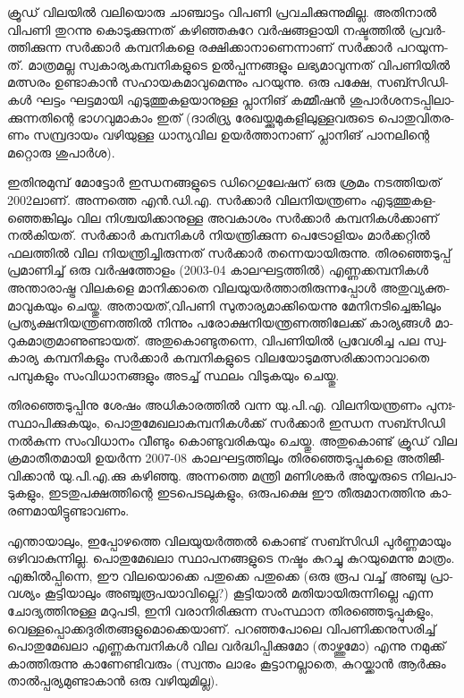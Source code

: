 ­ക്രൂ­ഡ് വി­ല­യില്‍ വലി­യൊ­രു ചാ­ഞ്ചാ­ട്ടം വി­പ­ണി പ്ര­വ­ചി­ക്കു­ന്നു­മി­ല്ല. അതി­നാല്‍ വി­പ­ണി തു­റ­ന്നു കൊ­ടു­ക്കു­ന്ന­ത് 
കഴി­ഞ്ഞ­കു­റേ വര്‍­ഷ­ങ്ങ­ളാ­യി നഷ്ട­ത്തില്‍ പ്ര­വര്‍­ത്തി­ക്കു­ന്ന സര്‍­ക്കാര്‍ കമ്പ­നി­ക­ളെ രക്ഷി­ക്കാ­നാ­ണെ­ന്നാ­ണ് സര്‍­ക്കാര്‍ 
പറ­യു­ന്ന­ത്. മാ­ത്ര­മ­ല്ല സ്വ­കാ­ര്യ­ക­മ്പ­നി­ക­ളു­ടെ ഉല്‍­പ്പ­ന്ന­ങ്ങ­ളും ലഭ്യ­മാ­വു­ന്ന­ത് വി­പ­ണി­യില്‍ മത്സ­രം ഉണ്ടാ­കാന്‍ 
സഹാ­യ­ക­മാ­വു­മെ­ന്നും പറ­യു­ന്നു. ഒരു പക്ഷേ, സബ്സി­ഡി­കള്‍ ഘട്ടം ഘട്ട­മാ­യി എടു­ത്തു­ക­ള­യാ­നു­ള്ള പ്ലാ­നി­ങ് 
കമ്മീ­ഷന്‍ ശു­പാര്‍­ശ­ന­ട­പ്പി­ലാ­ക്കു­ന്ന­തി­ന്റെ ഭാ­ഗ­വു­മാ­കാം ഇത് (ദാ­രി­ദ്ര്യ രേ­ഖ­യ്ക്കു­മു­ക­ളി­ലു­ള്ള­വ­രു­ടെ പൊ­തു­വി­ത­ര­ണം 
സമ്പ്ര­ദാ­യം വഴി­യു­ള്ള ധാ­ന്യ­വില ഉയര്‍­ത്താ­നാ­ണ് പ്ലാ­നി­ങ് പാ­ന­ലി­ന്റെ മറ്റൊ­രു ശു­പാര്‍­ശ).

ഇ­തി­നു­മു­മ്പ് മോ­ട്ടോര്‍ ഇന്ധ­ന­ങ്ങ­ളു­ടെ ഡി­റെ­ഗു­ലേ­ഷ­ന് ഒരു ശ്ര­മം നട­ത്തി­യ­ത് 2002­ലാ­ണ്. അന്ന­ത്തെ 
എന്‍.­ഡി­.എ. സര്‍­ക്കാര്‍ വി­ല­നി­യ­ന്ത്ര­ണം എടു­ത്തു­ക­ള­ഞ്ഞെ­ങ്കി­ലും വില നി­ശ്ച­യി­ക്കാ­നു­ള്ള അവ­കാ­ശം സര്‍­ക്കാര്‍ 
കമ്പ­നി­കള്‍­ക്കാ­ണ് നല്‍­കി­യ­ത്. സര്‍­ക്കാര്‍ കമ്പ­നി­കള്‍ നി­യ­ന്ത്രി­ക്കു­ന്ന ­പെ­ട്രോ­ളി­യം­ മാര്‍­ക്ക­റ്റില്‍ ഫല­ത്തില്‍ വില 
നി­യ­ന്ത്രി­ച്ചി­രു­ന്ന­ത് സര്‍­ക്കാര്‍ തന്നെ­യാ­യി­രു­ന്നു. തി­ര­ഞ്ഞെ­ടു­പ്പ് പ്ര­മാ­ണി­ച്ച് ഒരു വര്‍­ഷ­ത്തോ­ളം (2003-04 
കാ­ല­ഘ­ട്ട­ത്തില്‍) എണ്ണ­ക്ക­മ്പ­നി­കള്‍ അന്താ­രാ­ഷ്ട്ര വി­ല­ക­ളെ മാ­നി­ക്കാ­തെ വി­ല­യു­യര്‍­ത്താ­തി­രു­ന്ന­പ്പോള്‍ 
അതു­വ്യ­ക്ത­മാ­വു­ക­യും ചെ­യ്തു. അതാ­യ­ത്,­വി­പ­ണി സു­താ­ര്യ­മാ­ക്കി­യെ­ന്നു മേ­നി­ന­ടി­ച്ചെ­ങ്കി­ലും പ്ര­ത്യ­ക്ഷ­നി­യ­ന്ത്ര­ണ­ത്തില്‍ 
നി­ന്നും പരോ­ക്ഷ­നി­യ­ന്ത്ര­ണ­ത്തി­ലേ­ക്ക് കാ­ര്യ­ങ്ങള്‍ മാ­റു­ക­മാ­ത്ര­മാ­ണു­ണ്ടാ­യ­ത്. അതു­കൊ­ണ്ടു­ത­ന്നെ, വി­പ­ണി­യില്‍ 
പ്ര­വേ­ശി­ച്ച പല സ്വ­കാ­ര്യ കമ്പ­നി­ക­ളും സര്‍­ക്കാര്‍ കമ്പ­നി­ക­ളു­ടെ വി­ല­യോ­ടു­മ­ത്സ­രി­ക്കാ­നാ­വാ­തെ പമ്പു­ക­ളും 
സം­വി­ധാ­ന­ങ്ങ­ളും അട­ച്ച് സ്ഥ­ലം വി­ടു­ക­യും ചെ­യ്തു­.

­തി­ര­ഞ്ഞെ­ടു­പ്പി­നു ശേ­ഷം അധി­കാ­ര­ത്തില്‍ വന്ന യു­.­പി­.എ. വി­ല­നി­യ­ന്ത്ര­ണം പു­നഃ­സ്ഥാ­പി­ക്കു­ക­യും, 
പൊ­തു­മേ­ഖ­ലാ­ക­മ്പ­നി­കള്‍­ക്ക് സര്‍­ക്കാര്‍ ഇന്ധന സബ്സി­ഡി നല്‍­കു­ന്ന സം­വി­ധാ­നം വീ­ണ്ടും കൊ­ണ്ടു­വ­രി­ക­യും 
ചെ­യ്തു. അതു­കൊ­ണ്ട് ക്രൂ­ഡ് വില ക്ര­മാ­തീ­ത­മാ­യി ഉയര്‍­ന്ന 2007-08 കാ­ല­ഘ­ട്ട­ത്തി­ലും തി­ര­ഞ്ഞെ­ടു­പ്പു­ക­ളെ 
അതി­ജീ­വി­ക്കാന്‍ യു­.­പി­.എ­.­ക്കു കഴി­ഞ്ഞു. അന്ന­ത്തെ മന്ത്രി മണി­ശ­ങ്കര്‍ അയ്യ­രു­ടെ നി­ല­പാ­ടു­ക­ളും, ഇട­തു­പ­ക്ഷ­ത്തി­ന്റെ 
ഇട­പെ­ട­ലു­ക­ളും, ഒരു­പ­ക്ഷെ ഈ തീ­രു­മാ­ന­ത്തി­നു കാ­ര­ണ­മാ­യി­ട്ടു­ണ്ടാ­വ­ണം­.

എ­ന്താ­യാ­ലും, ഇപ്പോ­ഴ­ത്തെ വി­ല­യു­യര്‍­ത്തല്‍ കൊ­ണ്ട് സബ്സി­ഡി പുര്‍­ണ്ണ­മാ­യും ഒഴി­വാ­കു­ന്നി­ല്ല. പൊ­തു­മേ­ഖ­ലാ 
സ്ഥാ­പ­ന­ങ്ങ­ളു­ടെ നഷ്ടം കു­റ­ച്ചു കു­റ­യു­മെ­ന്നു മാ­ത്രം. എങ്കില്‍­പ്പി­ന്നെ, ഈ വി­ല­യൊ­ക്കെ പതു­ക്കെ പതു­ക്കെ (ഒ­രു രൂപ 
വച്ച് അഞ്ചു പ്രാ­വ­ശ്യം കൂ­ട്ടി­യാ­ലും അഞ്ചു­രൂ­പ­യാ­വി­ല്ലെ­?) കൂ­ട്ടി­യാല്‍ മതി­യാ­യി­രു­ന്നി­ല്ലെ എന്ന ചോ­ദ്യ­ത്തി­നു­ള്ള മറു­പ­ടി, 
ഇനി വരാ­നി­രി­ക്കു­ന്ന സം­സ്ഥാന തി­ര­ഞ്ഞെ­ടു­പ്പു­ക­ളും, വെ­ള്ള­പ്പൊ­ക്ക­ദു­രി­ത­ങ്ങ­ളു­മൊ­ക്കെ­യാ­ണ്. പറ­ഞ്ഞ­പോ­ലെ 
വി­പ­ണി­ക്ക­നു­സ­രി­ച്ച് പൊ­തു­മേ­ഖ­ലാ എണ്ണ­ക­മ്പ­നി­കള്‍ വില വര്‍­ദ്ധി­പ്പി­ക്കു­മോ (താ­ഴ്ത്തു­മോ) എന്നു നമു­ക്ക് കാ­ത്തി­രു­ന്നു 
കാ­ണേ­ണ്ടി­വ­രും (സ്വ­ന്തം ലാ­ഭം കൂ­ട്ടാ­ന­ല്ലാ­തെ, കു­റ­യ്ക്കാന്‍ ആര്‍­ക്കും താല്‍­പ്പ­ര്യ­മു­ണ്ടാ­കാന്‍ ഒരു വഴി­യു­മി­ല്ല).

